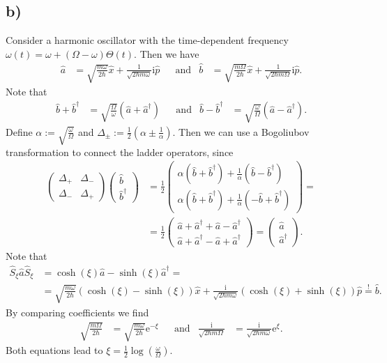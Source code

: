 \documentclass[english, parskip=full]{scrartcl}
\newcommand{\kla}{}
\newcommand{\tecxt}{}
\renewcommand{\i}{\text{i}}
\newcommand{\e}{\text{e}}
\begin{document}
\subsection*{b)}
Consider a harmonic oscillator with the time-dependent frequency $\omega(t)=\omega + (\Omega - \omega)\Theta(t)$.
Then we have
\begin{align}
\hat{a} &= \sqrt{\frac{m\omega}{2\hbar}}\hat{x} + \frac{1}{\sqrt{2\hbar m\omega}}\i\hat{p}&&\tecxt\text{and} & \hat{b} &= \sqrt{\frac{m\Omega}{2\hbar}}\hat{x} + \frac{1}{\sqrt{2\hbar m\Omega}}\i\hat{p}.
\end{align}
Note that
\begin{align}
\hat{b} + \hat{b}^\dagger &= \sqrt{\frac{\Omega}{\omega}}\kla\left( \hat{a} + \hat{a}^\dagger \right)&&\tecxt\text{and} & \hat{b} - \hat{b}^\dagger &= \sqrt{\frac{\omega}{\Omega}}\kla\left( \hat{a} - \hat{a}^\dagger \right).
\end{align}
Define $\alpha :=\sqrt{\frac{\omega}{\Omega}}$ and $\Delta_\pm := \frac{1}{2}\kla\left( \alpha \pm \frac{1}{\alpha} \right)$.
Then we can use a Bogoliubov transformation to connect the ladder operators, since
\begin{align}
\begin{pmatrix}
\Delta_+&\Delta_- \\ \Delta_-&\Delta_+
\end{pmatrix}
\begin{pmatrix}
\hat{b} \\ \hat{b}^\dagger
\end{pmatrix} &= \frac{1}{2}\begin{pmatrix}
\alpha \kla\left( \hat{b} + \hat{b}^\dagger \right) + \frac{1}{\alpha}\kla\left( \hat{b} - \hat{b}^\dagger \right) \\ 
\alpha \kla\left( \hat{b} + \hat{b}^\dagger \right) + \frac{1}{\alpha}\kla\left( -\hat{b} + \hat{b}^\dagger \right) 
\end{pmatrix} = \\
&=\frac{1}{2}\begin{pmatrix}
\hat{a} + \hat{a}^\dagger + \hat{a} - \hat{a}^\dagger  \\ 
\hat{a} + \hat{a}^\dagger - \hat{a} + \hat{a}^\dagger 
\end{pmatrix}=\begin{pmatrix}
\hat{a} \\ \hat{a}^\dagger
\end{pmatrix}.
\end{align}
Note that
\begin{align}
\hat{S}_\xi\hat{a}\hat{S}_\xi &= \cosh(\xi)\hat{a} - \sinh(\xi)\hat{a}^\dagger = \\
&=\sqrt{\frac{m\omega}{2\hbar}}\kla\left( \cosh(\xi) - \sinh(\xi) \right)\hat{x} + \frac{\i}{\sqrt{2\hbar m\omega}}\kla\left( \cosh(\xi) + \sinh(\xi) \right)\hat{p}\overset{!}{=}\hat{b}.
\end{align}
By comparing coefficients we find
\begin{align}
\sqrt{\frac{m\Omega}{2\hbar}}&=\sqrt{\frac{m\omega}{2\hbar}} \e^{-\xi}&&\tecxt\text{and}& \frac{\i}{\sqrt{2\hbar m\Omega}}&=\frac{\i}{\sqrt{2\hbar m\omega}}\e^\xi.
\end{align}
Both equations lead to $\xi=\frac{1}{2}\log\kla\left( \frac{\omega}{\Omega} \right)$.
\end{document}
